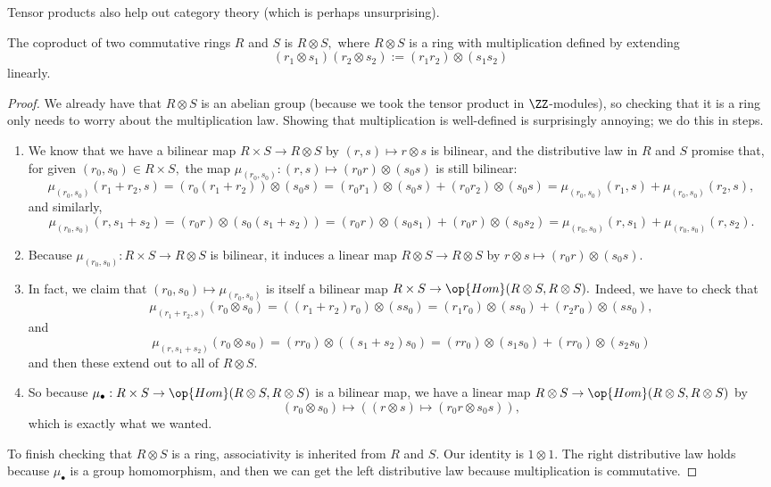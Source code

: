 \documentclass[../notes.tex]{subfiles}
\begin{document}
Tensor products also help out category theory (which is perhaps unsurprising).
\begin{proposition}
	The coproduct of two commutative rings $R$ and $S$ is $R\otimes S,$ where $R\otimes S$ is a ring with multiplication defined by extending
	\[(r_1\otimes s_1)(r_2\otimes s_2):=(r_1r_2)\otimes(s_1s_2)\]
	linearly.
\end{proposition}
\begin{proof}
	We already have that $R\otimes S$ is an abelian group (because we took the tensor product in $\ZZ$-modules), so checking that it is a ring only needs to worry about the multiplication law. Showing that multiplication is well-defined is surprisingly annoying; we do this in steps.
	\begin{enumerate}[label=(\roman*)]
		\item We know that we have a bilinear map $R\times S\to R\otimes S$ by $(r,s)\mapsto r\otimes s$ is bilinear, and the distributive law in $R$ and $S$ promise that, for given $(r_0,s_0)\in R\times S,$ the map $\mu_{(r_0,s_0)}:(r,s)\mapsto(r_0r)\otimes(s_0s)$ is still bilinear:
		\[\mu_{(r_0,s_0)}(r_1+r_2,s)=(r_0(r_1+r_2))\otimes(s_0s)=(r_0r_1)\otimes(s_0s)+(r_0r_2)\otimes(s_0s)=\mu_{(r_0,s_0)}(r_1,s)+\mu_{(r_0,s_0)}(r_2,s),\]
		and similarly,
		\[\mu_{(r_0,s_0)}(r,s_1+s_2)=(r_0r)\otimes(s_0(s_1+s_2))=(r_0r)\otimes(s_0s_1)+(r_0r)\otimes(s_0s_2)=\mu_{(r_0,s_0)}(r,s_1)+\mu_{(r_0,s_0)}(r,s_2).\]
		\item Because $\mu_{(r_0,s_0)}:R\times S\to R\otimes S$ is bilinear, it induces a linear map $R\otimes S\to R\otimes S$ by $r\otimes s\mapsto(r_0r)\otimes(s_0s).$
		\item In fact, we claim that $(r_0,s_0)\mapsto\mu_{(r_0,s_0)}$ is itself a bilinear map $R\times S\to\op{Hom}(R\otimes S,R\otimes S).$ Indeed, we have to check that
		\[\mu_{(r_1+r_2,s)}(r_0\otimes s_0)=((r_1+r_2)r_0)\otimes (ss_0)=(r_1r_0)\otimes(ss_0)+(r_2r_0)\otimes(ss_0),\]
		and
		\[\mu_{(r,s_1+s_2)}(r_0\otimes s_0)=(rr_0)\otimes ((s_1+s_2)s_0)=(rr_0)\otimes(s_1s_0)+(rr_0)\otimes(s_2s_0)\]
		and then these extend out to all of $R\otimes S.$
		\item So because $\mu_\bullet:R\times S\to\op{Hom}(R\otimes S,R\otimes S)$ is a bilinear map, we have a linear map $R\otimes S\to\op{Hom}(R\otimes S,R\otimes S)$ by
		\[(r_0\otimes s_0)\mapsto((r\otimes s)\mapsto(r_0r\otimes s_0s)),\]
		which is exactly what we wanted.
	\end{enumerate}
	To finish checking that $R\otimes S$ is a ring, associativity is inherited from $R$ and $S.$ Our identity is $1\otimes 1.$ The right distributive law holds because $\mu_\bullet$ is a group homomorphism, and then we can get the left distributive law because multiplication is commutative.
	

\end{proof}
\end{document}
